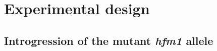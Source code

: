 %
%



\section{Experimental design}
\subsection{Introgression of the mutant \textit{hfm1} allele}



